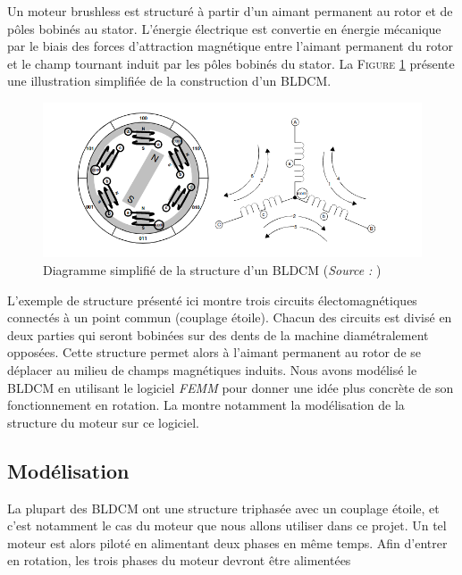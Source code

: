 \documentclass[a4paper,12pt]{book}
\begin{document}
				
				 Un moteur brushless est structuré à partir d'un aimant permanent au rotor et de pôles bobinés au stator. L'énergie électrique est convertie en énergie mécanique par le biais des forces d'attraction magnétique entre l'aimant permanent du rotor et le champ tournant induit par les pôles bobinés du stator. La \textsc{Figure \ref{struct_bldcm}} présente une illustration simplifiée de la construction d'un BLDCM. 
				 
				 \begin{figure}
				 	\begin{center}
				 		\includegraphics[scale=0.7]{../Illus/struct_bldcm.png}
				 	\end{center}
				 	\caption{Diagramme simplifié de la structure d'un BLDCM (\textit{Source :} \cite{AN857})}
				 	\label{struct_bldcm}
				 \end{figure}
				 
				 L'exemple de structure présenté ici montre trois circuits électomagnétiques connectés à un point commun (couplage étoile). Chacun des circuits est divisé en deux parties qui seront bobinées sur des dents de la machine diamétralement opposées. Cette structure permet alors à l'aimant permanent au rotor de se déplacer au milieu de champs magnétiques induits. Nous avons modélisé le BLDCM en utilisant le logiciel \textit{FEMM} pour donner une idée plus concrète de son fonctionnement en rotation. La montre notamment la modélisation de la structure du moteur sur ce logiciel.
				 
				 \subsection{Modélisation}
				 

				 La plupart des BLDCM ont une structure triphasée avec un couplage étoile, et c'est notamment le cas du moteur que nous allons utiliser dans ce projet. Un tel moteur est alors piloté en alimentant deux phases en même temps. Afin d'entrer en rotation, les trois phases du moteur devront être alimentées 
				 
\end{document}
